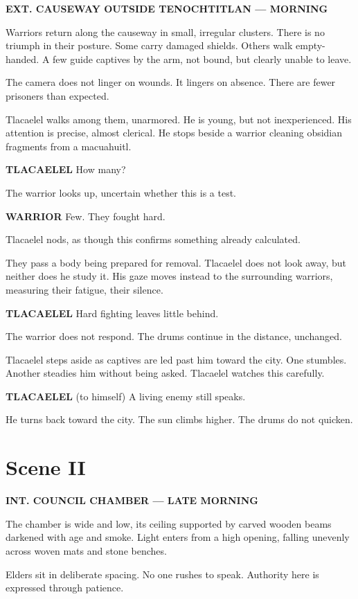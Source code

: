 \documentclass[12pt]{article}
\begin{document}
\textbf{EXT. CAUSEWAY OUTSIDE TENOCHTITLAN --- MORNING}

Warriors return along the causeway in small, irregular clusters. There is no triumph in their posture. Some carry damaged shields. Others walk empty-handed. A few guide captives by the arm, not bound, but clearly unable to leave.

The camera does not linger on wounds. It lingers on absence. There are fewer prisoners than expected.

Tlacaelel walks among them, unarmored. He is young, but not inexperienced. His attention is precise, almost clerical. He stops beside a warrior cleaning obsidian fragments from a macuahuitl.

\textbf{TLACAELEL}  
How many?

The warrior looks up, uncertain whether this is a test.

\textbf{WARRIOR}  
Few. They fought hard.

Tlacaelel nods, as though this confirms something already calculated.

They pass a body being prepared for removal. Tlacaelel does not look away, but neither does he study it. His gaze moves instead to the surrounding warriors, measuring their fatigue, their silence.

\textbf{TLACAELEL}  
Hard fighting leaves little behind.

The warrior does not respond. The drums continue in the distance, unchanged.

Tlacaelel steps aside as captives are led past him toward the city. One stumbles. Another steadies him without being asked. Tlacaelel watches this carefully.

\textbf{TLACAELEL}  
(to himself)  
A living enemy still speaks.

He turns back toward the city. The sun climbs higher. The drums do not quicken.

\section*{Scene II}

\textbf{INT. COUNCIL CHAMBER --- LATE MORNING}

The chamber is wide and low, its ceiling supported by carved wooden beams darkened with age and smoke. Light enters from a high opening, falling unevenly across woven mats and stone benches.

Elders sit in deliberate spacing. No one rushes to speak. Authority here is expressed through patience.
\end{document}
